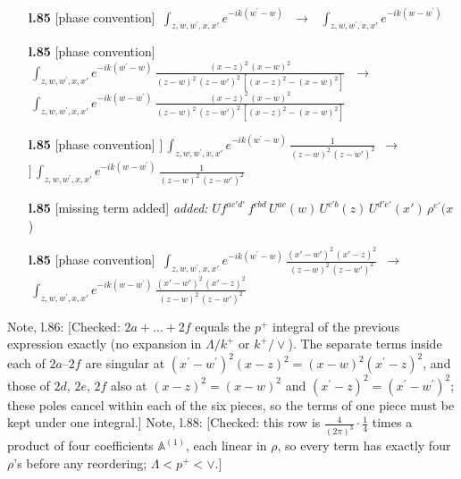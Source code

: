 \documentclass[10pt]{article}
\newenvironment{notebox}{\def\FrameCommand{{\color{notebar}\vrule width 1.5pt}\hspace{6pt}}\MakeFramed{\advance\hsize-\width\FrameRestore}\small}{\endMakeFramed}
\def\mf#1{\mathbb{#1}}
\begin{document}
\begin{itemize}[leftmargin=2.2em,itemsep=1pt,topsep=2pt]
\item[\textbf{l.85}] \textsf{\small [phase convention]} $\displaystyle \,\int_{z,w,w^{\prime},x,x'} e^{-ik(w^{\prime}-w)}\,$\ $\longrightarrow$\ $\displaystyle \,\int_{z,w,w^{\prime},x,x'} e^{-ik(w-w^{\prime})}\,$
\item[\textbf{l.85}] \textsf{\small [phase convention]} $\displaystyle \,\int_{z,w,w^{\prime},x,x'} e^{-ik(w^{\prime}-w)}\,\frac{(x-z)^{2}\, (x-w)^{2}}{(z-w)^{2}\, (z-w')^{2}\,[(x-z)^{2} - (x-w)^{2}]}\,$\ $\longrightarrow$\ $\displaystyle \,\int_{z,w,w^{\prime},x,x'} e^{-ik(w-w^{\prime})}\,\frac{(x-z)^{2}\, (x-w)^{2}}{(z-w)^{2}\, (z-w')^{2}\,[(x-z)^{2} - (x-w)^{2}]}\,$
\item[\textbf{l.85}] \textsf{\small [phase convention]} $\displaystyle ]\,\int_{z,w,w^{\prime},x,x'} e^{-ik(w^{\prime}-w)}\,\frac{1}{(z-w)^{2}\, (z-w')^{2}}$\ $\longrightarrow$\ $\displaystyle ]\,\int_{z,w,w^{\prime},x,x'} e^{-ik(w-w^{\prime})}\,\frac{1}{(z-w)^{2}\, (z-w')^{2}}$
\item[\textbf{l.85}] \textsf{\small [missing term added]} \emph{added:} $\displaystyle U$$\displaystyle f^{ac'd'}\,f^{cbd}\,U^{ac}(w)\,U^{c'b}(z)\,U^{d'e'}(x')\,\rho^{e'}(x${\color{gray}\small)}
\item[\textbf{l.85}] \textsf{\small [phase convention]} $\displaystyle \,\int_{z,w,w^{\prime},x,x'} e^{-ik(w^{\prime}-w)}\,\frac{(x'-w')^{2}\, (x'-z)^{2}}{(z-w)^{2}\, (z-w')^{2}}$\ $\longrightarrow$\ $\displaystyle \,\int_{z,w,w^{\prime},x,x'} e^{-ik(w-w^{\prime})}\,\frac{(x'-w')^{2}\, (x'-z)^{2}}{(z-w)^{2}\, (z-w')^{2}}$
\end{itemize}
\begin{notebox}\textsf{\small Note, l.86:} [Checked: $2a+\dots+2f$ equals the $p^{+}$ integral of the previous expression exactly (no expansion in $\Lambda/k^{+}$ or $k^{+}/\vee$). The separate terms inside each of $2a$--$2f$ are singular at $(x^{\prime}-w^{\prime})^{2}(x-z)^{2}=(x-w)^{2}(x^{\prime}-z)^{2}$, and those of $2d$, $2e$, $2f$ also at $(x-z)^{2}=(x-w)^{2}$ and $(x^{\prime}-z)^{2}=(x^{\prime}-w^{\prime})^{2}$; these poles cancel within each of the six pieces, so the terms of one piece must be kept under one integral.]\end{notebox}
\begin{notebox}\textsf{\small Note, l.88:} [Checked: this row is $\frac{4}{(2\pi)^3}\cdot\frac14$ times a product of four coefficients $\mf{A}^{(1)}$, each linear in $\rho$, so every term has exactly four $\rho$'s before any reordering; $\Lambda<p^+<\vee$.]\end{notebox}
\end{document}
